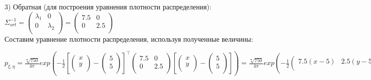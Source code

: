 \documentclass{article}
\begin{document}
3) Обратная (для построения уравнения плотности распределения):\\
$\Sigma_{ort}^{-1}=
\left(
    {\begin{array}{cc}
    		\lambda_{1} & 0\\
    		0 & \lambda_{2}\\
  	\end{array}}
\right)=
\left(
    {\begin{array}{cc}
    		7.5 & 0\\
    		0 & 2.5\\
  	\end{array}}
\right)$\\

Составим уравнение плотности распределения, используя полученные величины:

$p_{\xi,\eta}=\frac{\sqrt[•]{750}}{4\pi}exp\left(
-\frac{1}{2}
\left[
  	\left(
  		{\begin{array}{c}
    			x\\
    			y\\
  		\end{array}}
  	\right)
-
  	\left(
  		{\begin{array}{c}
    			5\\
    			5\\
  		\end{array}}
  	\right)
\right]^\top
\left(
	{\begin{array}{cc}
  		7.5 & 0\\
  		0 & 2.5\\
	\end{array}}
\right)
\left[
 	 \left(
  		{\begin{array}{c}
    			x\\
    			y\\
  		\end{array}}
  	\right)
-
  	\left(
  		{\begin{array}{c}
    			5\\
    			5\\
  		\end{array}}
  	\right)
\right]
\right)
=
\frac{\sqrt[•]{750}}{4\pi}exp\left(
-\frac{1}{2}
\left(
	{\begin{array}{cc}
  		7.5(x-5) & 2.5(y-5)\\
	\end{array}}
\right)
\left(
  	{\begin{array}{c}
    		x-5\\
    		y-5\\
  	\end{array}}
\right)
\right)
=
\frac{\sqrt[•]{750}}{4\pi}exp\left(-\frac{1}{2}(7.5x^2-75x+2.5y^2-25y+250)\right)$\\
\end{document}
